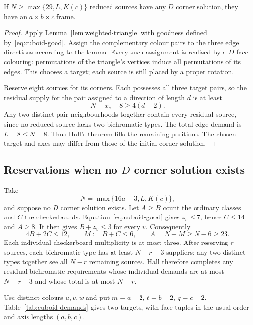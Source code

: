 \begin{corollary}\label{cor:cuboid-D}
If $N\ge\max\{29,L,K(c)\}$ reduced sources have any $D$ corner solution,
they have an $a\times b\times c$ frame.
\end{corollary}
\begin{proof}
Apply Lemma~\ref{lem:weighted-triangle} with goodness defined
by~\eqref{eq:cuboid-good}. Assign the complementary colour pairs to the
three edge directions according to the lemma. Every such assignment is
realised by a $D$ face colouring: permutations of the triangle's vertices
induce all permutations of its edges. This chooses a target; each source
is still placed by a proper rotation.

Reserve eight sources for its corners. Each possesses all three target
pairs, so the residual supply for the pair assigned to a direction of
length $d$ is at least
\[
 N-x_e-8\ge4(d-2).
\]
Any two distinct pair neighbourhoods together contain every residual
source, since no reduced source lacks two bichromatic types. The total
edge demand is $L-8\le N-8$. Thus Hall's theorem fills the remaining
positions. The chosen target and axes may differ from those of the
initial corner solution.
\end{proof}

\subsection{Reservations when no \texorpdfstring{$D$}{D} corner solution exists}
Take
\[
 N=\max\{16a-3,L,K(c)\},
\]
and suppose no $D$ corner solution exists. Let $A\ge B$ count the ordinary
classes and $C$ the checkerboards. Equation~\eqref{eq:cuboid-good} gives
$z_v\le7$, hence $C\le14$ and $A\ge8$. It then gives $B+z_v\le3$ for
every $v$. Consequently
\begin{equation}\label{eq:cuboid-minority}
 4B+2C\le12,\qquad M:=B+C\le6,\qquad A=N-M\ge N-6\ge23.
\end{equation}
Each individual checkerboard multiplicity is at most three.
After reserving $r$ sources, each bichromatic type has at least $N-r-3$
suppliers; any two distinct types together see all $N-r$ remaining
sources. Hall therefore completes any residual bichromatic requirements
whose individual demands are at most $N-r-3$ and whose total is at most
$N-r$.

Use distinct colours $u,v,w$ and put $m=a-2$, $t=b-2$, $q=c-2$.
Table~\ref{tab:cuboid-demands} gives two targets, with face tuples in the
usual order and axis lengths $(a,b,c)$.

